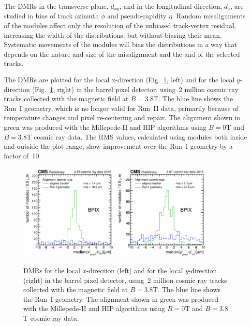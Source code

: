 The DMRs in the transverse plane, $d_{xy}$, and in the longitudinal direction, $d_{z}$, are studied in bins of track azimuth $\phi$ and pseudo-rapidity $\eta$. Random misalignments of the modules affect only the resolution of the unbiased track-vertex residual, increasing the width of the distributions, but without biasing their mean. Systematic movements of the modules will bias the distributions in a way that depends on the nature and size of the misalignment and the and of the selected tracks.

The DMRs are plotted for the local x-direction (Fig.~\ref{fig:DMRs}, left) and for the local $y$-direction (Fig.~\ref{fig:DMRs}, right) in the barrel pixel detector, using~2 million cosmic ray tracks collected with the magnetic field at $B=3.8$T. The blue line shows the Run~I geometry, which is no longer valid for Run~II data, primarily because of temperature changes and pixel re-centering and repair. The alignment shown in green was produced with the Millepede-II and HIP algorithms using $B=0$T and $B=3.8$T cosmic ray data. The RMS values, calculated using modules both inside and outside the plot range, show improvement over the Run~I geometry by a factor of~10.

\begin{figure}[htb]
    \begin{center}
        \includegraphics[width=0.45\textwidth]{../figs/Alignment/AlRes_CRAFT_DmedianR_BPIX_plain.png}\includegraphics[width=0.45\textwidth]{../figs/Alignment/AlRes_CRAFT_DmedianYR_BPIX_plain.png}
    \end{center}
    \caption {DMRs for the local $x$-direction (left) and for the local $y$-direction (right) in the barrel pixel detector, using~2 million cosmic ray tracks collected with the magnetic field at $B=3.8$T. The blue line shows the Run~I geometry. The alignment shown in green was produced with the Millepede-II and HIP algorithms using $B=0$T and $B=3.8$T cosmic ray data.}
    \label{fig:DMRs}
\end{figure}

